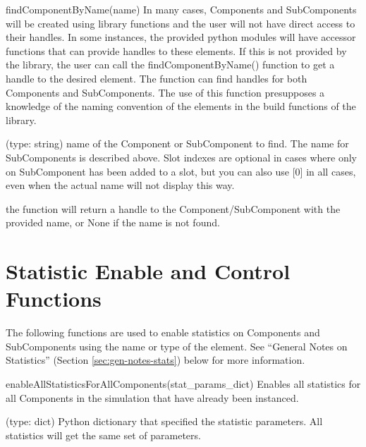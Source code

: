 \begin{functiondoc}{findComponentByName(name)}{
    In many cases, Components and SubComponents will be created using
    library functions and the user will not have direct access to
    their handles.  In some instances, the provided python modules
    will have accessor functions that can provide handles to these
    elements.  If this is not provided by the library, the user can
    call the findComponentByName() function to get a handle to the
    desired element.  The function can find handles for both
    Components and SubComponents.  The use of this function
    presupposes a knowledge of the naming convention of the elements
    in the build functions of the library.
}

   (type: string) name of the Component or SubComponent to
  find.  The name for SubComponents is described above.  Slot indexes
  are optional in cases where only on SubComponent has been added to a
  slot, but you can also use [0] in all cases, even when the actual
  name will not display this way.

  \returns the function will return a handle to the
  Component/SubComponent with the provided name, or None if the name
  is not found.
\end{functiondoc}


\section{Statistic Enable and Control Functions}
\label{sec:stat-enable}

The following functions are used to enable statistics on Components
and SubComponents using the name or type of the element.  See “General
Notes on Statistics” (Section \ref{sec:gen-notes-stats}) below for more
information.

\begin{functiondoc}{enableAllStatisticsForAllComponents(stat_params_dict)}{
    Enables all statistics for all Components in the simulation that
    have already been instanced.
}
  
   (type: dict) Python dictionary that specified the
  statistic parameters.  All statistics will get the same set of
  parameters.

  \noreturn
\end{functiondoc}


